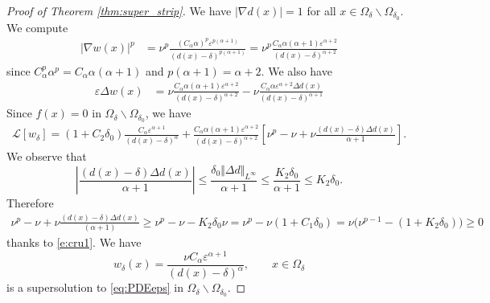 \documentclass[10pt]{article}
\theoremstyle{plain}
\theoremstyle{remark}
\begin{document}
\begin{proof}[Proof of Theorem \ref{thm:super_strip}] We have $|\nabla d(x)| = 1$ for all $x\in \Omega_\delta\backslash \Omega_{\delta_0}$. We compute 
\begin{equation*}
\begin{split}
    |\nabla w(x)|^p &= \nu^p\frac{(C_\alpha\alpha)^p\varepsilon^{p(\alpha+1)}}{(d(x)-\delta)^{p(\alpha+1)}} = \nu^p\frac{C_\alpha \alpha(\alpha+1)\varepsilon^{\alpha+2}}{(d(x)-\delta)^{\alpha+2}}
\end{split}
\end{equation*}
since $C_\alpha^p \alpha^p = C_\alpha \alpha (\alpha+1)$ and $p(\alpha+1) = \alpha+2$. We also have
\begin{equation*}
\begin{split}
    \varepsilon\Delta w(x) &= \nu\frac{C_\alpha\alpha(\alpha+1)\varepsilon^{\alpha+2}}{(d(x)-\delta)^{\alpha+2}} - \nu\frac{C_\alpha\alpha\varepsilon^{\alpha+2}\Delta d(x)}{(d(x)-\delta)^{\alpha+1}}
\end{split}
\end{equation*}
Since $f(x) = 0$ in $\Omega_\delta\backslash \Omega_{\delta_0}$, we have
\begin{equation*}
    \begin{split}
        \mathcal{L}\left[w_\delta\right] = (1+C_2\delta_0)\frac{C_\alpha\varepsilon^{\alpha+1}}{(d(x)-\delta)^\alpha} + \frac{C_\alpha \alpha (\alpha+1)\varepsilon^{\alpha+2}}{(d(x)-\delta)^{\alpha+2}}\left[\nu^p-\nu +\nu\frac{(d(x)-\delta)\Delta d(x)}{\alpha+1}\right].
    \end{split}
\end{equation*}
We observe that
\begin{equation*}
    \left|\frac{(d(x)-\delta)\Delta d(x)}{\alpha+1}\right| \leq \frac{\delta_0\Vert \Delta d\Vert_{L^\infty}}{\alpha+1} \leq \frac{K_2\delta_0}{\alpha+1}\leq K_2\delta_0.
\end{equation*}
Therefore
\begin{equation*}
    \begin{split}
        \nu^p-\nu +\nu\frac{(d(x)-\delta)\Delta d(x)}{(\alpha+1)} \geq \nu^p - \nu - K_2\delta_0 \nu  = \nu^p - \nu (1+C_1\delta_0) = \nu\Big(\nu^{p-1} - (1+K_2\delta_0)\Big) \geq 0
    \end{split}
\end{equation*}
thanks to \eqref{e:cru1}. We have 
\begin{equation*}
    w_{\delta}(x) = \frac{\nu C_\alpha \varepsilon^{\alpha+1}}{(d(x)-\delta)^\alpha}, \qquad x\in \Omega_\delta
\end{equation*}
is a supersolution to \eqref{eq:PDEeps} in $\Omega_\delta\backslash\Omega_{\delta_0}$.
\end{proof}
\noindent
\end{document}
